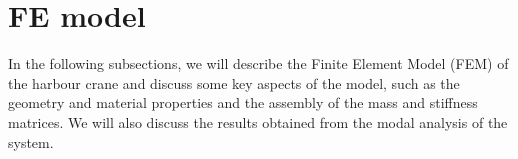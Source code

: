 \section{FE model}
\label{sec:FE_model}

In the following subsections, we will describe the Finite Element Model (FEM) of the harbour crane and discuss some key aspects of the model, such as the geometry and material properties and the assembly of the mass and stiffness matrices.
We will also discuss the results obtained from the modal analysis of the system.





